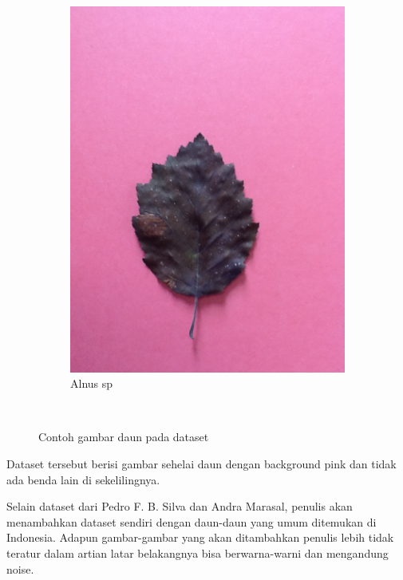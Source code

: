\begin{figure}[ht]
\begin{subfigure}{0.5\textwidth}
		\centering\includegraphics[width=\linewidth]{bab3/figures/alnus_sp.JPG}
		\caption{Alnus sp}
		\label{fig:alnus_sp}
	\end{subfigure}
	~
	\caption{Contoh gambar daun pada dataset}
\end{figure}

\par Dataset tersebut berisi gambar sehelai daun dengan background pink dan tidak ada benda lain di sekelilingnya. 

\par Selain dataset dari Pedro F. B. Silva dan Andra Marasal, penulis akan menambahkan dataset sendiri dengan daun-daun yang umum ditemukan di Indonesia. Adapun gambar-gambar yang akan ditambahkan penulis lebih tidak teratur dalam artian latar belakangnya bisa berwarna-warni dan mengandung noise.


